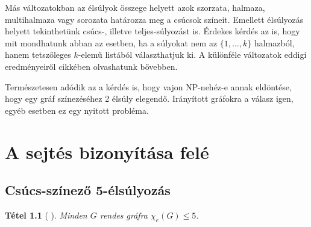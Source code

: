 \documentclass[12pt, a4paper]{report}
\newtheorem{tét}{Tétel}[section]
\theoremstyle{remark}
\theoremstyle{definition}
\begin{document}
Más változatokban az élsúlyok összege helyett azok szorzata, halmaza, multihalmaza vagy sorozata határozza meg a csúcsok színeit. Emellett élsúlyozás helyett tekinthetünk csúcs-, illetve teljes-súlyozást is. Érdekes kérdés az is, hogy mit mondhatunk abban az esetben, ha a súlyokat nem az $\lbrace 1, \ldots, k \rbrace$ halmazból, hanem tetszőleges $k$-elemű listából választhatjuk ki. A különféle változatok eddigi eredményeiről \citeauthor{Seamone2012} \cite{Seamone2012} cikkében olvashatunk bővebben.

Természetesen adódik az a kérdés is, hogy vajon NP-nehéz-e annak eldöntése, hogy egy gráf színezéséhez 2 élsúly elegendő. Irányított gráfokra a válasz igen, egyéb esetben ez egy nyitott probléma.

\chapter{A sejtés bizonyítása felé}

\section{Csúcs-színező 5-élsúlyozás}
\begin{tét}[\citeauthor{Kalkowski2010} \cite{Kalkowski2010}]
Minden $G$ rendes gráfra $\chi_e(G) \leq 5$.
\end{tét}
\end{document}
